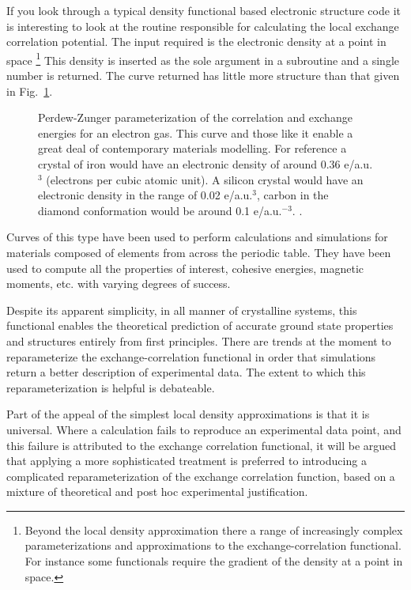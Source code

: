 If you look through a typical density functional based electronic structure code 
it is interesting to look at the routine
responsible for calculating the local exchange correlation potential. 
The input required is the electronic density at a point in space \footnote{Beyond the local density
approximation there a range of increasingly complex parameterizations and
approximations to the exchange-correlation functional. For instance some functionals
require the gradient of the density at a point in space.} This 
density is inserted as the sole argument in a subroutine and a single number is returned. The curve
returned has little more structure than that given in Fig.~\ref{fig:ldapz}. 
%
\begin{figure}
\begin{center}
\graphicspath{{./intro/}}
\caption{Perdew-Zunger parameterization of the correlation and exchange energies for an electron gas.
This curve and those like it enable a great deal of contemporary materials modelling. For reference
a crystal of iron would have an electronic density of around 0.36 e/a.u.$^{3}$ (electrons per cubic
atomic unit). A silicon crystal would have an electronic density in the range of 0.02 e/a.u.$^{3}$,
carbon in the diamond conformation would be around 0.1 e/a.u.$^{-3}$.  
\label{fig:ldapz}.}
\end{center}
\end{figure}
%
Curves of this type have been used to perform calculations and simulations for 
materials composed of elements from across the periodic table. They have been
used to compute all the properties of interest, cohesive energies, magnetic moments,
etc. with varying degrees of success.

Despite its apparent simplicity, in all manner of crystalline systems, 
this functional enables the theoretical
prediction of accurate ground state properties and structures entirely from first principles. 
There are trends at the moment to reparameterize the exchange-correlation functional
in order that simulations return a better description of experimental data. The extent
to which this reparameterization is helpful is debateable. 

Part of the appeal of the simplest local density approximations is that it is universal. 
Where a calculation fails to reproduce an experimental data point, and this failure is attributed to the
exchange correlation functional, it will be argued that applying a more sophisticated treatment
is preferred to introducing a complicated reparameterization of the exchange correlation
function, based on a mixture of theoretical and post hoc experimental justification.

